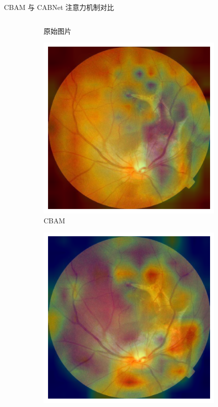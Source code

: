 \documentclass[9pt, aspectratio=1610]{beamer}
\begin{document}
\begin{frame}{CBAM 与 CABNet 注意力机制对比}
\begin{columns}
\begin{column}{0.6\textwidth}
\begin{figure}[H]
\begin{subfigure}[b]{0.2\textwidth}
                    \caption{原始图片}
                \end{subfigure}
                \hspace{2mm}
                \begin{subfigure}[b]{0.2\textwidth}
                    \centering
                    \includegraphics[width=\textwidth]{cbam-heatmap-3.png}
                    \caption{CBAM}
                \end{subfigure}
                \hspace{2mm}
                \begin{subfigure}[b]{0.2\textwidth}
                    \raggedright
                    \includegraphics[width=\textwidth]{cabnet-heatmap-3.png}

\end{subfigure}
\end{figure}
\end{column}
\end{columns}
\end{frame}
\end{document}
